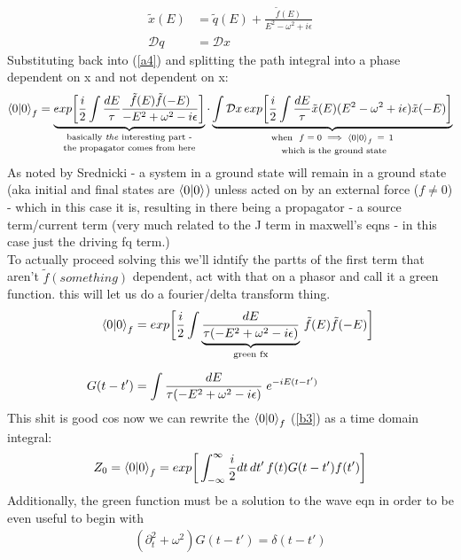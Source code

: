\documentclass[10pt]{article}
\begin{document}
\begin{align}
	\tilde{x}(E) &= \tilde{q}(E) + \frac{ \tilde{f}(E) }{E^2 - \omega^2 + i\epsilon } \\
	\mathcal{D}q &= \mathcal{D}x
\end{align}
Substituting back into (\ref{a4}) and splitting the path integral into a phase dependent on x and not dependent on x:
\begin{align}
	\braket{0}{0}_f = \underbrace{ exp \bigg[ \frac{i}{2} \int \frac{dE}{\tau} \frac{ \tilde{f}(E) \tilde{f}(-E) }{-E^2+\omega^2-i\epsilon} \bigg] }_{\text{\shortstack{basically \textit{the} interesting part -\\ the propagator comes from here}}} \cdot \underbrace{ \int \mathcal{D}x\, exp \bigg[ \frac{i}{2} \int \frac{dE}{\tau} \tilde{x}(E) (E^2 - \omega^2 +i\epsilon) \tilde{x}(-E) \bigg] }_{\text{\shortstack{{when } $f=0 \implies \braket{0}{0}_f	\, = \, 1$ \\ \text{ which is the ground state}}}}
\end{align}
As noted by Srednicki - a system in a ground state will remain in a ground state (aka initial and final states are $\braket{0}{0}$) unless acted on by an external force ($f \neq 0$) - which in this case it is, resulting in there being a propagator - a source term/current term (very much related to the J term in maxwell's eqns - in this case just the driving fq term.) \\
To actually proceed solving this we'll idntify the partts of the first term that aren't $\tilde{f}(something)$ dependent, act with that on a phasor and call it a green function. this will let us do a fourier/delta transform thing.
\begin{align}
	\braket{0}{0}_f &= exp \bigg[ \frac{i}{2} \int \underbrace{ \frac{dE}{\tau(-E^2+\omega^2-i\epsilon)}}_{\text{green fx}} \, \tilde{f}(E) \tilde{f}(-E) \bigg] \label{b3}\\[1.5Ex]
	G(t-t') &= \int \frac{dE}{\tau(-E^2+\omega^2-i\epsilon)} \; e^{-iE(t-t')} \label{b1}
\end{align}
This shit is good cos now we can rewrite the $\braket{0}{0}_f$ (\ref{b3}) as a time domain integral:
\begin{align}
	Z_0 = \braket{0}{0}_f = exp \bigg[\int_{-\infty}^{\infty}\frac{i}{2}dt\,dt'\,f(t)G(t-t')f(t')\bigg] \label{b4}
\end{align}
Additionally, the green function must be a solution to the wave eqn in order to be even useful to begin with
\begin{align}
	(\partial_{t}^2 + \omega^2)G(t-t') = \delta(t-t') \label{b2}
\end{align}
\end{document}

